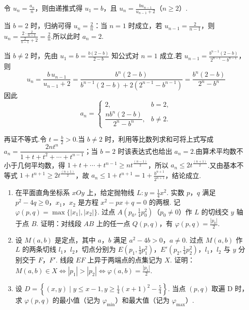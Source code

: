 \begin{solution}
令 \(u_n=\frac{a_n}{n}\)，则由递推式得 \(u_1=b\)，且 \(u_n=\frac{b u_{n-1}}{u_{n-1}+2}\)（\(n\geqslant2\)）.

当 \(b=2\) 时，归纳可得 \(u_n=\frac2n\)：当 \(n=1\) 时成立，若 \(u_{n-1}=\frac{2}{n-1}\)，则 \(u_n=\frac{2\cdot\frac2{n-1}}{\frac2{n-1}+2}=\frac2n\).所以此时 \(a_n=2\).

当 \(b\neq2\) 时，先由 \(u_1=b=\frac{b(2-b)}{2-b}\) 知公式对 \(n=1\) 成立.若 \(u_{n-1}=\frac{b^{n-1}(2-b)}{2^{n-1}-b^{n-1}}\)，则
\[
u_n=\frac{b\,u_{n-1}}{u_{n-1}+2}=\frac{b^n(2-b)}{b^{n-1}(2-b)+2(2^{n-1}-b^{n-1})}=\frac{b^n(2-b)}{2^n-b^n}
\]
因此
\[
a_n=\begin{cases}
2,&b=2,\\
\dfrac{n b^n(2-b)}{2^n-b^n},&b\neq2.
\end{cases}
\]

再证不等式.令 \(t=\frac b2>0\).当 \(b\neq2\) 时，利用等比数列求和可将上式写成 \(a_n=\dfrac{2nt^n}{1+t+t^2+\cdots+t^{n-1}}\)；当 \(b=2\) 时该表达式也给出 \(a_n=2\).由算术平均数不小于几何平均数，得 \(1+t+\cdots+t^{n-1}\geqslant n t^{\frac{(n-1)}{2}}\)，所以 \(a_n\leqslant2t^{\frac{(n+1)}{2}}\).又由基本不等式 \(1+t^{n+1}\geqslant2t^{\frac{(n+1)}{2}}\)，故 \(a_n\leqslant1+t^{n+1}=1+\frac{b^{n+1}}{2^{n+1}}\)，结论成立.
\end{solution}

\begin{problem}
\begin{enumerate}
\item 在平面直角坐标系 \(xOy\) 上，给定抛物线 \(L: y = \frac{1}{4} x^2\). 实数 \(p\)，\(q\) 满足 \(p^2 - 4q \geqslant 0\)，\(x_1\)，\(x_2\) 是方程 \(x^2 - px + q = 0\) 的两根. 记 \(\varphi(p, q) = \max \{|x_1|, |x_2|\}\). 过点 \(A\left(p_0, \frac{1}{4} p_0^2\right)\)（\(p_0 \neq 0\)）作 \(L\) 的切线交 \(y\) 轴于点 \(B\). 证明：对线段 \(AB\) 上的任一点 \(Q(p, q)\)，有 \(\varphi(p, q) = \frac{|p_0|}{2}\).
\item 设 \(M(a, b)\) 是定点，其中 \(a\)，\(b\) 满足 \(a^2 - 4b > 0\)，\(a \neq 0\). 过点 \(M(a, b)\) 作 \(L\) 的两条切线 \(l_1\)，\(l_2\)，切点分别为 \(E\left(p_1, \frac{1}{4} p_1^2\right)\)，\(E'\left(p_2, \frac{1}{4} p_2^2\right)\)，\(l_1\)，\(l_2\) 与 \(y\) 分别交于 \(F\)，\(F'\). 线段 \(EF\) 上异于两端点的点集记为 \(X\). 证明：\(M(a, b) \in X \Leftrightarrow |p_1| > |p_2| \Leftrightarrow \varphi(a, b) = \frac{|p_1|}{2}\).
\item 设 \(D = \left\{(x, y) \mid y \leqslant x - 1, y \geqslant \frac{1}{4} (x + 1)^2 - \frac{5}{4}\right\}\). 当点 \((p, q)\) 取遍 D 时，求 \(\varphi(p, q)\) 的最小值（记为 \(\varphi_{\min}\)）和最大值（记为 \(\varphi_{\max}\)）.
\end{enumerate}
\end{problem}

